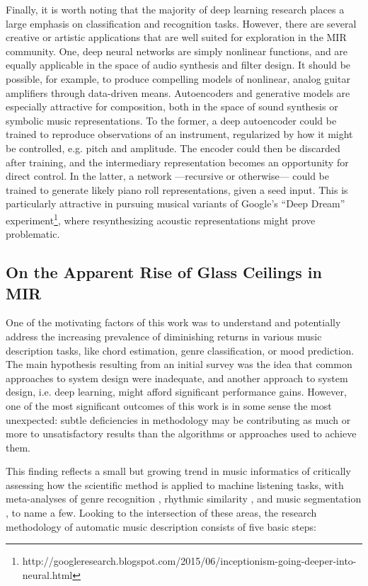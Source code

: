 Finally, it is worth noting that the majority of deep learning research places a large emphasis on classification and recognition tasks.
However, there are several creative or artistic applications that are well suited for exploration in the MIR community.
One, deep neural networks are simply nonlinear functions, and are equally applicable in the space of audio synthesis and filter design.
It should be possible, for example, to produce compelling models of nonlinear, analog guitar amplifiers through data-driven means.
Autoencoders and generative models are especially attractive for composition, both in the space of sound synthesis or symbolic music representations.
To the former, a deep autoencoder could be trained to reproduce observations of an instrument, regularized by how it might be controlled, e.g. pitch and amplitude.
The encoder could then be discarded after training, and the intermediary representation becomes an opportunity for direct control.
In the latter, a network ---recursive or otherwise--- could be trained to generate likely piano roll representations, given a seed input.
This is particularly attractive in pursuing musical variants of Google's ``Deep Dream'' experiment\footnote{http://googleresearch.blogspot.com/2015/06/inceptionism-going-deeper-into-neural.html}, where resynthesizing acoustic representations might prove problematic.


\subsection{On the Apparent Rise of Glass Ceilings in MIR}

One of the motivating factors of this work was to understand and potentially address the increasing prevalence of diminishing returns in various music description tasks, like chord estimation, genre classification, or mood prediction.
The main hypothesis resulting from an initial survey was the idea that common approaches to system design were inadequate, and another approach to system design, i.e. deep learning, might afford significant performance gains.
However, one of the most significant outcomes of this work is in some sense the most unexpected:
subtle deficiencies in methodology may be contributing as much or more to unsatisfactory results than the algorithms or approaches used to achieve them.

This finding reflects a small but growing trend in music informatics of critically assessing how the scientific method is applied to machine listening tasks, with meta-analyses of genre recognition \cite{Sturm2014Simple}, rhythmic similarity \cite{Esparza2014Genre}, and music segmentation \cite{Nieto2015Segmentation}, to name a few.
Looking to the intersection of these areas, the research methodology of automatic music description consists of five basic steps:

